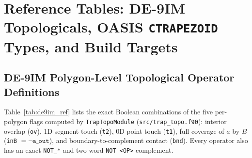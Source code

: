 \chapter{Reference Tables: DE-9IM Topologicals, OASIS \texttt{CTRAPEZOID} Types, and Build Targets}
\label{app:ref}

\section{DE-9IM Polygon-Level Topological Operator Definitions}

Table~\ref{tab:de9im_ref} lists the exact Boolean combinations of the five per-polygon flags computed by \texttt{TrapTopoModule} (\texttt{src/trap\_topo.f90}): interior overlap (\texttt{ov}), 1D segment touch (\texttt{t2}), 0D point touch (\texttt{t1}), full coverage of $a$ by $B$ (\texttt{inB} $= \neg\texttt{a\_out}$), and boundary-to-complement contact (\texttt{bnd}). Every operator also has an exact \texttt{NOT\_*} and two-word \texttt{NOT <OP>} complement.

